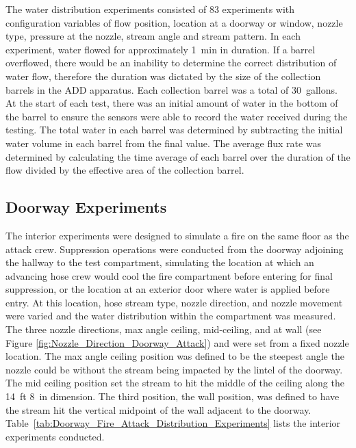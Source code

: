 \documentclass[12pt,oneside]{book}
\begin{document}
The water distribution experiments consisted of 83 experiments with configuration variables of flow position, location at a doorway or window, nozzle type, pressure at the nozzle, stream angle and stream pattern. In each experiment, water flowed for approximately 1~min in duration. If a barrel overflowed, there would be an inability to determine the correct distribution of water flow, therefore the duration was dictated by the size of the collection barrels in the ADD apparatus. Each collection barrel was a total of 30~gallons.  At the start of each test, there was an initial amount of water in the bottom of the barrel to ensure the sensors were able to record the water received during the testing. The total water in each barrel was determined by subtracting the initial water volume in each barrel from the final value. The average flux rate was determined by calculating the time average of each barrel over the duration of the flow divided by the effective area of the collection barrel. 

\subsection{Doorway Experiments}
\label{int_tests}
The interior experiments were designed to simulate a fire on the same floor as the attack crew. Suppression operations were conducted from the doorway adjoining the hallway to the test compartment, simulating the location at which an advancing hose crew would cool the fire compartment before entering for final suppression, or the location at an exterior door where water is applied before entry. At this location, hose stream type, nozzle direction, and nozzle movement were varied and the water distribution within the compartment was measured. The three nozzle directions, max angle ceiling, mid-ceiling, and at wall (see Figure \ref{fig:Nozzle_Direction_Doorway_Attack}) and were set from a fixed nozzle location. The max angle ceiling position was defined to be the steepest angle the nozzle could be without the stream being impacted by the lintel of the doorway. The mid ceiling position set the stream to hit the middle of the ceiling along the 14~ft 8~in dimension. The third position, the wall position, was defined to have the stream hit the vertical midpoint of the wall adjacent to the doorway. Table~\ref{tab:Doorway_Fire_Attack_Distribution_Experiments} lists the interior experiments conducted.
\end{document}
